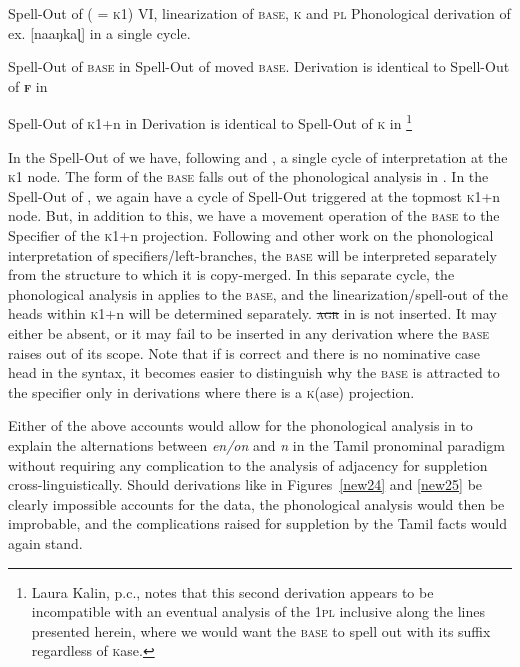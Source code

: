 \documentclass[output=paper]{langscibook}
\begin{document}
\begin{exe}
\ex
\begin{xlist}
\ex \label{new25c}
Spell-Out of ( = \textsc{k}1)  \rightarrow 
\ea VI, linearization of \textsc{base}, \textsc{k} and \textsc{pl}
\ex Phonological derivation of ex. [naaŋkaɭ]  in a single cycle.
\z

\ex \label{new25d} 
Spell-Out of \textsc{base} in  \rightarrow 
\ea Spell-Out of moved \textsc{base}. Derivation  is identical to Spell-Out 	of \textbf{\textsc{f}} in 
\z

Spell-Out of \textsc{k}1+n in   \rightarrow 
\ea Derivation is identical to Spell-Out of \textsc{k} in \footnote{Laura Kalin, p.c., notes that this second derivation appears to be incompatible with an eventual analysis of the 1\textsc{pl} inclusive along the lines presented herein, where we would want the \textsc{base} to spell out with its suffix regardless of \textsc{k}ase.}\z
\end{xlist}
\end{exe}

In the Spell-Out of  we have, following \citet{Moskal2015} and \citet{moskal2016towards}, a single cycle of interpretation at the \textsc{k}1 node. The form of the \textsc{base} falls out of the phonological analysis in . In the Spell-Out of , we again have a cycle of Spell-Out triggered at the topmost \textsc{k}1+n node. But, in addition to this, we have a movement operation of the \textsc{base} to the Specifier of the \textsc{k}1+n projection. Following \citet{Johnson2004} and other work on the phonological interpretation of specifiers/left-branches, the \textsc{base} will be interpreted separately from the structure to which it is copy-merged. In this separate cycle, the phonological analysis in  applies to the \textsc{base}, and the linearization/spell-out of the heads within \textsc{k}1+n will be determined separately. \textsc{\sout{agr}} in  is not inserted. It may either be absent, or it may fail to be inserted in any derivation where the \textsc{base} raises out of its scope. Note that if \citet{mcfadden2018aba} is correct and there is no nominative case head in the syntax, it becomes easier to distinguish why the \textsc{base} is attracted to the specifier only in derivations where there is a \textsc{k}(ase) projection.

Either of the above accounts would allow for the phonological analysis in  to explain the alternations between \textit{en/on} and \textit{n} in the Tamil pronominal paradigm without requiring any complication to the analysis of adjacency for suppletion cross-linguistically. Should derivations like in Figures~\ref{new24} and \ref{new25} be clearly impossible accounts for the data, the phonological analysis would then be improbable, and the complications raised for suppletion by the Tamil facts would again stand.
\end{document}
